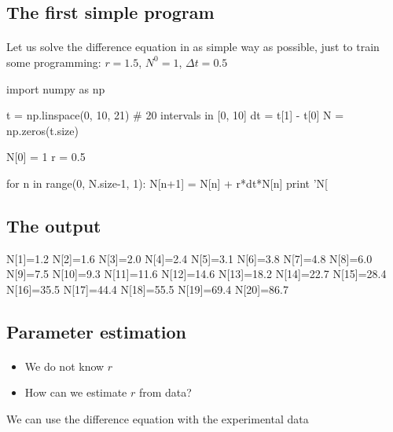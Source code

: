 \documentclass[%
twoside,                 %
final,                   %
10pt]{article}
\begin{document}
\noindent



\subsection{The first simple program}


\paragraph{}
Let us solve the difference equation in as simple way as possible,
just to train some programming: $r=1.5$, $N^0=1$, $\Delta t=0.5$

\bpypro
import numpy as np

t = np.linspace(0, 10, 21)  # 20 intervals in [0, 10]
dt = t[1] - t[0]
N = np.zeros(t.size)

N[0] = 1
r = 0.5

for n in range(0, N.size-1, 1):
    N[n+1] = N[n] + r*dt*N[n]
    print 'N[%
\epypro



\subsection{The output}

\bccq
N[1]=1.2
N[2]=1.6
N[3]=2.0
N[4]=2.4
N[5]=3.1
N[6]=3.8
N[7]=4.8
N[8]=6.0
N[9]=7.5
N[10]=9.3
N[11]=11.6
N[12]=14.6
N[13]=18.2
N[14]=22.7
N[15]=28.4
N[16]=35.5
N[17]=44.4
N[18]=55.5
N[19]=69.4
N[20]=86.7
\eccq

\subsection{Parameter estimation}


\paragraph{}
\begin{itemize}
 \item We do not know $r$

 \item How can we estimate $r$ from data?
\end{itemize}

\noindent
We can use the difference equation with the experimental data
\end{document}
